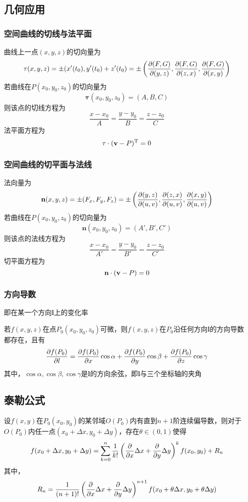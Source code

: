 \subsection{几何应用}
\subsubsection{空间曲线的切线与法平面}
曲线上一点$(x,y,z)$的切向量为
\[\mathbf{\tau}(x,y,z)=\pm(x'(t_0),y'(t_0)+z'(t_0)=\pm\left(\dfrac{\partial (F,G)}{\partial (y,z)},\dfrac{\partial (F,G)}{\partial (z,x)},\dfrac{\partial (F,G)}{\partial (x,y)}\right)\]
若曲线在$P(x_0,y_0,z_0)$的切向量为
\[\mathbf{\tau}(x_0,y_0,z_0)=(A,B,C)\]
则该点的切线方程为
\[\frac{x-x_0}{A}=\frac{y-y_0}{B}=\frac{z-z_0}{C}\]
法平面方程为
\[\mathbf{\tau}\cdot(\mathbf{v}-P)^{\mathrm{T}}=0\]

\subsubsection{空间曲线的切平面与法线}
法向量为
\[\mathbf{n}(x,y,z)=\pm(F_x,F_y,F_z)=\pm\left(\dfrac{\partial (y,z)}{\partial (u,v)},\dfrac{\partial (z,x)}{\partial (u,v)},\dfrac{\partial (x,y)}{\partial (u,v)}\right)\]
若曲线在$P(x_0,y_0,z_0)$的切向量为
\[\mathbf{n}(x_0,y_0,z_0)=(A',B',C')\]
则该点的法线方程为
\[\frac{x-x_0}{A'}=\frac{y-y_0}{B'}=\frac{z-z_0}{C'}\]
切平面方程为
\[\mathbf{n}\cdot(\mathbf{v}-P)=0\]

\subsubsection{方向导数}
即在某一个方向$\mathbf{l}$上的变化率
\begin{theorem}
若$f(x,y,z)$在点$P_0(x_0,y_0,z_0)$可微，则$f(x,y,z)$在$P_0$沿任何方向$\mathbf{l}$的方向导数都存在，且有
\[\dfrac{\partial f(P_0)}{\partial l}=\dfrac{\partial f(P_0)}{\partial x}\cos\alpha+\dfrac{\partial f(P_0)}{\partial y}\cos\beta+\dfrac{\partial f(P_0)}{\partial z}\cos\gamma\]
其中，$\cos\alpha,\cos\beta,\cos\gamma$是$\mathbf{l}$的方向余弦，即$\mathbf{l}$与三个坐标轴的夹角
\end{theorem}

\subsection{泰勒公式}
\begin{theorem}[Taylor]
设$f(x,y)$在$P_0(x_0,y_0)$的某邻域$O(P_0)$内有直到$n+1$阶连续偏导数，则对于$O(P_0)$内任一点$(x_0+\Delta x,y_0+\Delta y)$，存在$\theta\in(0,1)$使得
\[f(x_0+\Delta x,y_0+\Delta y)=\sum_{k=0}^n\frac{1}{k!}\left(\dfrac{\partial }{\partial x}\Delta x+\dfrac{\partial }{\partial y}\Delta y\right)^kf(x_0,y_0)+R_n\]
其中，
\[R_n=\frac{1}{(n+1)!}\left(\dfrac{\partial }{\partial x}\Delta x+\dfrac{\partial }{\partial y}\Delta y\right)^{n+1}f(x_0+\theta\Delta x,y_0+\theta\Delta y)\]
\end{theorem}

